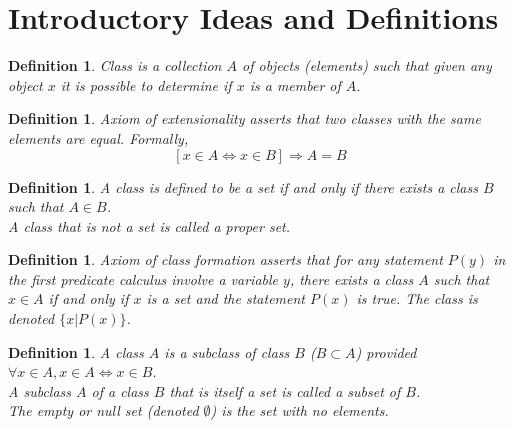 \documentclass[a4paper,sfsidenotes,openany]{tufte-book}
\theoremstyle{theorem}
\newtheorem{definition}[theorem]{Definition}
\begin{document}
\section{Introductory Ideas and Definitions}
\begin{fullwidth}

\begin{definition}
\textit{{\color{blue} Class}} is a collection $ A $ of objects (elements) such that given any object $ x $ it is possible to determine if $ x $ is a member of $ A $.\\
\end{definition}
\>

\begin{definition}
\textit{{\color{blue} Axiom of extensionality}} asserts that two classes with the same elements are equal. Formally, 
\begin{equation}
\left[x \in A \Longleftrightarrow x \in B \right] \Rightarrow A=B
\end{equation}
\end{definition}
\>

\begin{definition}
A class is defined to be a \textit{{\color{blue} set}} if and only if there exists a class $ B $ such that $ A \in B $.\\
A class that is not a set is called a \textit{{\color{blue} proper set}}.\\
\end{definition}
\>

\begin{definition}
\textit{{\color{blue} Axiom of class formation}} asserts that for any statement $ P(y) $ in the first predicate calculus involve a variable $ y $, there exists a class $ A $ such that $ x \in A $ if and only if $ x $ is a set and the statement $ P(x) $ is true. The class is denoted 	$\{ x | P(x) \}$.\\
\end{definition}
\>

\begin{definition}
A class $ A $ is a \textit{{\color{blue} subclass}} of class $ B $ ($ B \subset A $) provided $ \forall x \in A, x \in A \Longleftrightarrow x \in B $. \\
A subclass $ A $ of a class $ B $ that is itself a set is called a \textit{{\color{blue} subset}} of $ B $.\\
The \textit{{\color{blue} empty or null set}} (denoted $\emptyset$) is the set with no elements.\\
\end{definition}
\>


\end{fullwidth}
\end{document}
